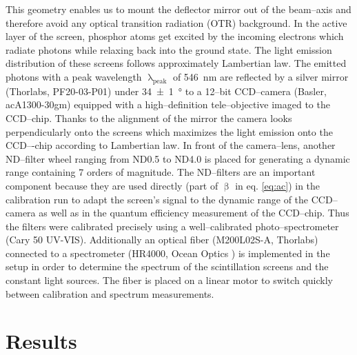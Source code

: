 \documentclass[%
reprint,
amsmath,
amssymb,
aip,
rsi, 
numerical,
floatfix,
]{revtex4-1}
\newcommand{\myCite}[1]{\textcolor{blue}{\cite{#1}}}
\begin{document}
This geometry enables us to mount the deflector mirror out of the beam--axis and therefore avoid any optical transition radiation (OTR) background. 
In the active layer of the screen, phosphor atoms get excited by the incoming electrons which radiate photons while relaxing back into the ground state. 
The light emission distribution of these screens follows approximately Lambertian law\myCite{Giakoumakis1985}. 
The emitted photons with a peak wavelength $\uplambda_{\text{peak}}$ of \SI{546}{\nano\metre} are reflected by a silver mirror (Thorlabs, PF20-03-P01) under \SI[separate-uncertainty = true]{34(1)}{\degree} to a 12–bit CCD–camera (Basler, acA1300-30gm) equipped with a high--definition tele--objective imaged to the CCD--chip. 
Thanks to the alignment of the mirror the camera looks perpendicularly onto the screens which maximizes the light emission onto the CCD–-chip according to Lambertian law. 
In front of the camera--lens, another ND--filter wheel ranging from ND0.5 to ND4.0 is placed for generating a dynamic range containing 7 orders of magnitude. 
The ND--filters are an important component because they are used directly (part of $\upbeta$ in eq. \ref{eq:ac}) in the calibration run to adapt the screen's signal to the dynamic range of the CCD--camera as well as in the quantum efficiency measurement of the CCD--chip.
Thus the filters were calibrated precisely using a well--calibrated photo--spectrometer (Cary\textsuperscript{\textregistered} 50 UV-VIS).
Additionally an optical fiber (M200L02S-A, Thorlabs) connected to a spectrometer (HR4000, Ocean Optics ) is implemented in the setup in order to determine the spectrum of the scintillation screens and the constant light sources.
The fiber is placed on a linear motor to switch quickly between calibration and spectrum measurements. 
 


\section{\label{Res} Results}
\end{document}
